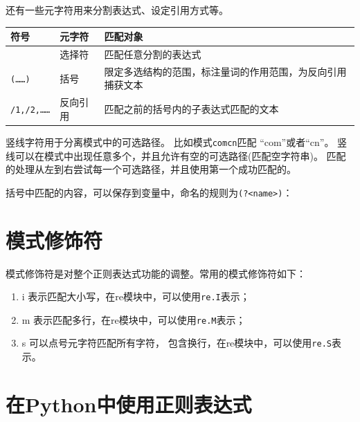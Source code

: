 \documentclass[]{ctexbook}
\newenvironment{Shaded}{\begin{snugshade}}{\end{snugshade}}
\newcommand{\KeywordTok}[1]{\textcolor[rgb]{0.13,0.29,0.53}{\textbf{#1}}}
\newcommand{\NormalTok}[1]{#1}
\newcommand{\OtherTok}[1]{\textcolor[rgb]{0.56,0.35,0.01}{#1}}
\newcommand{\StringTok}[1]{\textcolor[rgb]{0.31,0.60,0.02}{#1}}
\providecommand{\tightlist}{%
  \setlength{\itemsep}{0pt}\setlength{\parskip}{0pt}}
\begin{document}
还有一些元字符用来分割表达式、设定引用方式等。

\begin{longtable}[]{@{}lll@{}}
\toprule
符号 & 元字符 & 匹配对象\tabularnewline
\midrule
\endhead
\textbar{} & 选择符 & 匹配任意分割的表达式\tabularnewline
\texttt{(\ldots{}\ldots{})} & 括号 & 限定多选结构的范围，标注量词的作用范围，为反向引用捕获文本\tabularnewline
\texttt{/1,/2,\ldots{}\ldots{}} & 反向引用 & 匹配之前的括号内的子表达式匹配的文本\tabularnewline
\bottomrule
\end{longtable}

竖线字符用于分离模式中的可选路径。 比如模式\texttt{com\textbar{}cn}匹配 ``com''或者``cn''。 竖线可以在模式中出现任意多个，并且允许有空的可选路径(匹配空字符串)。 匹配的处理从左到右尝试每一个可选路径，并且使用第一个成功匹配的。

括号中匹配的内容，可以保存到变量中，命名的规则为\texttt{(?\textless{}name\textgreater{})}：

\begin{Shaded}
\end{Shaded}

\hypertarget{ux6a21ux5f0fux4feeux9970ux7b26}{%
\section{模式修饰符}\label{ux6a21ux5f0fux4feeux9970ux7b26}}

模式修饰符是对整个正则表达式功能的调整。常用的模式修饰符如下：

\begin{enumerate}
\def\labelenumi{\arabic{enumi}.}
\tightlist
\item
  i 表示匹配大小写，在re模块中，可以使用\texttt{re.I}表示；
\item
  m 表示匹配多行，在re模块中，可以使用\texttt{re.M}表示；
\item
  s 可以点号元字符匹配所有字符， 包含换行，在re模块中，可以使用\texttt{re.S}表示。
\end{enumerate}

\hypertarget{ux5728pythonux4e2dux4f7fux7528ux6b63ux5219ux8868ux8fbeux5f0f}{%
\section{在Python中使用正则表达式}\label{ux5728pythonux4e2dux4f7fux7528ux6b63ux5219ux8868ux8fbeux5f0f}}
\end{document}
